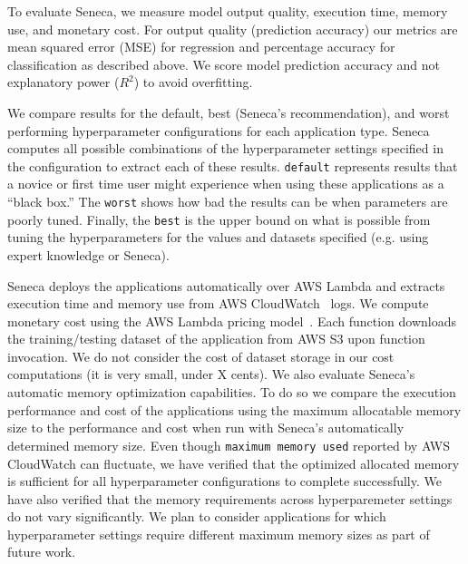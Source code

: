 To evaluate Seneca, we measure model output quality, execution time, memory use, and monetary cost.  For output quality (prediction accuracy) our metrics are mean squared error (MSE) for regression and percentage accuracy for classification as described above. We score model prediction accuracy and not explanatory power ($R^2$) to avoid overfitting. 


We compare results for the default, best (Seneca's recommendation), and worst performing hyperparameter configurations for each application type. Seneca computes all possible combinations of the hyperparameter settings specified in the configuration to extract each of these results.  \texttt{default} represents results that a novice or first time user might experience when using these applications as a ``black box.''  The \texttt{worst} shows how bad the results can be when parameters are poorly tuned.  Finally, the \texttt{best} is the upper bound on what is possible from tuning the hyperparameters for the values and datasets specified  (e.g. using expert knowledge or Seneca). 

Seneca deploys the applications automatically over AWS Lambda
and extracts execution time and memory use from 
AWS CloudWatch~\cite{ref:awscloudwatch} logs.
We compute monetary cost using the AWS Lambda pricing model~\cite{ref:pricing}.
Each function downloads the training/testing dataset 
of the application from AWS S3 upon function invocation. 
We do not consider the cost of dataset storage 
in our cost computations (it is very small, under X cents).
We also evaluate Seneca's automatic memory optimization capabilities.  To
do so we compare the execution performance and cost of the applications using
the maximum allocatable memory size to the performance and cost when run with
Seneca's automatically determined memory size. Even though \texttt{maximum memory used} reported by AWS CloudWatch can fluctuate, we 
have verified that the optimized allocated memory is sufficient for all 
hyperparameter configurations to complete successfully.  We have also verified
that the memory requirements across hyperparemeter settings do not vary 
significantly. We plan to consider applications for which hyperparameter settings require
different maximum memory sizes as part of future work.


